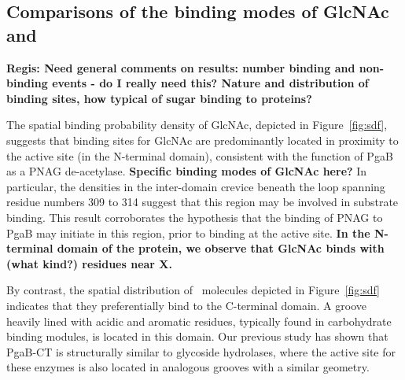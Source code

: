 \subsection{Comparisons of the binding modes of GlcNAc and \glucosamine}
\textbf{Regis: Need general comments on results: number binding and non-binding events - do I really need this? Nature and distribution of binding sites, how typical of sugar binding to proteins?}

The spatial binding probability density of GlcNAc, depicted in Figure~\ref{fig:sdf}, suggests that binding sites for GlcNAc are predominantly located in proximity to the active site (in the N-terminal domain), consistent with the function of PgaB as a PNAG de-acetylase. \textbf{Specific binding modes of GlcNAc here?} In particular, the densities in the inter-domain crevice beneath the loop spanning residue numbers 309 to 314 suggest that this region may be involved in substrate binding. This result corroborates the hypothesis that the binding of PNAG to PgaB may initiate in this region, prior to binding at the active site.\cite{Little:2012dp}  \textbf{In the N-terminal domain of the protein, we observe that GlcNAc binds with (what kind?) residues near X.}




By contrast, the spatial distribution of \glucosamine\ molecules depicted in Figure~\ref{fig:sdf} indicates that they preferentially bind to the C-terminal domain. A groove heavily lined with acidic and aromatic residues, typically found in carbohydrate binding modules, is located in this domain. Our previous study has shown that PgaB-CT is structurally similar to glycoside hydrolases,\cite{Little:2012dp} where the active site for these enzymes is also located in analogous grooves with a similar geometry. 

